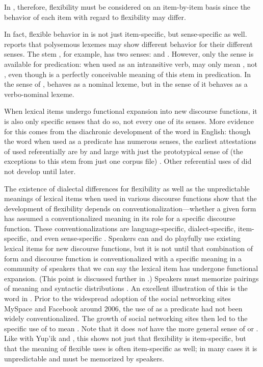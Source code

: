 \noindent In , therefore, flexibility must be considered on an item-by-item basis since the behavior of each item with regard to flexibility may differ.

In fact, flexible behavior in  is not just item-specific, but sense-specific as well. \textcite[54]{Creissels2017} reports that polysemous lexemes may show different behavior for their different senses. The stem , for example, has two senses:  and . However, only the  sense is available for predication: when used as an intransitive verb,  may only mean , not , even though  is a perfectly conceivable meaning of this stem in predication. In the sense of ,  behaves as a nominal lexeme, but in the sense of  it behaves as a verbo-nominal lexeme.

When lexical items undergo functional expansion into new discourse functions, it is also only specific senses that do so, not every one of its senses. More evidence for this comes from the diachronic development of the word  in English: though the word  when used as a predicate has numerous senses, the earliest attestations of  used referentially are by and large with just the prototypical sense of  (the exceptions to this stem from just one corpus file) \parencite[76]{Gries2006}. Other referential uses of  did not develop until later.

The existence of dialectal differences for flexibility as well as the unpredictable meanings of lexical items when used in various discourse functions show that the development of flexibility depends on conventionalization—whether a given form has assumed a conventionalized meaning in its role for a specific discourse function. These conventionalizations are language-specific, dialect-specific, item-specific, and even sense-specific \parencite[97]{Croft2000}. Speakers can and do playfully use existing lexical items for new discourse functions, but it is not until that combination of form and discourse function is conventionalized with a specific meaning in a community of speakers that we can say the lexical item has undergone functional expansion. (This point is discussed further in .) Speakers must memorize pairings of meaning and syntactic distributions \parencite[217]{Beck2013}. An excellent illustration of this is the word  in . Prior to the widespread adoption of the social networking sites MySpace and Facebook around 2006, the use of  as a predicate had not been widely conventionalized. The growth of social networking sites then led to the specific use of  to mean . Note that it does \emph{not} have the more general sense of  or . Like with Yup'ik and , this shows not just that flexibility is item-specific, but that the meaning of flexible uses is often item-specific as well; in many cases it is unpredictable and must be memorized by speakers.

